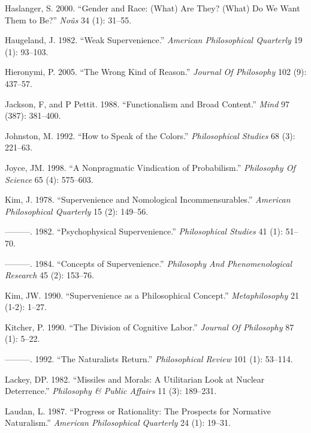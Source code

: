 \documentclass[
  10pt,
  letterpaper,
  DIV=11,
  numbers=noendperiod,
  twoside]{scrartcl}
\newlength{\cslhangindent}
\newenvironment{CSLReferences}[2] %
 {\begin{list}{}{%
  \setlength{\itemindent}{0pt}
  \setlength{\leftmargin}{0pt}
  \setlength{\parsep}{0pt}
  \ifodd #1
   \setlength{\leftmargin}{\cslhangindent}
   \setlength{\itemindent}{-1\cslhangindent}
  \fi
  \setlength{\itemsep}{#2\baselineskip}}}
 {\end{list}}
\begin{document}
\begin{CSLReferences}{1}{0}
Haslanger, S. 2000. {``Gender and Race: (What) Are They? (What) Do We
Want Them to Be?''} \emph{Noûs} 34 (1): 31--55.

Haugeland, J. 1982. {``Weak Supervenience.''} \emph{American
Philosophical Quarterly} 19 (1): 93--103.

Hieronymi, P. 2005. {``The Wrong Kind of Reason.''} \emph{Journal Of
Philosophy} 102 (9): 437--57.

Jackson, F, and P Pettit. 1988. {``Functionalism and Broad Content.''}
\emph{Mind} 97 (387): 381--400.

Johnston, M. 1992. {``How to Speak of the Colors.''} \emph{Philosophical
Studies} 68 (3): 221--63.

Joyce, JM. 1998. {``A Nonpragmatic Vindication of Probabilism.''}
\emph{Philosophy Of Science} 65 (4): 575--603.

Kim, J. 1978. {``Supervenience and Nomological Incommensurables.''}
\emph{American Philosophical Quarterly} 15 (2): 149--56.

---------. 1982. {``Psychophysical Supervenience.''} \emph{Philosophical
Studies} 41 (1): 51--70.

---------. 1984. {``Concepts of Supervenience.''} \emph{Philosophy And
Phenomenological Research} 45 (2): 153--76.

Kim, JW. 1990. {``Supervenience as a Philosophical Concept.''}
\emph{Metaphilosophy} 21 (1-2): 1--27.

Kitcher, P. 1990. {``The Division of Cognitive Labor.''} \emph{Journal
Of Philosophy} 87 (1): 5--22.

---------. 1992. {``The Naturalists Return.''} \emph{Philosophical
Review} 101 (1): 53--114.

Lackey, DP. 1982. {``Missiles and Morals: A Utilitarian Look at Nuclear
Deterrence.''} \emph{Philosophy \& Public Affairs} 11 (3): 189--231.

Laudan, L. 1987. {``Progress or Rationality: The Prospects for Normative
Naturalism.''} \emph{American Philosophical Quarterly} 24 (1): 19--31.


\end{CSLReferences}
\end{document}
